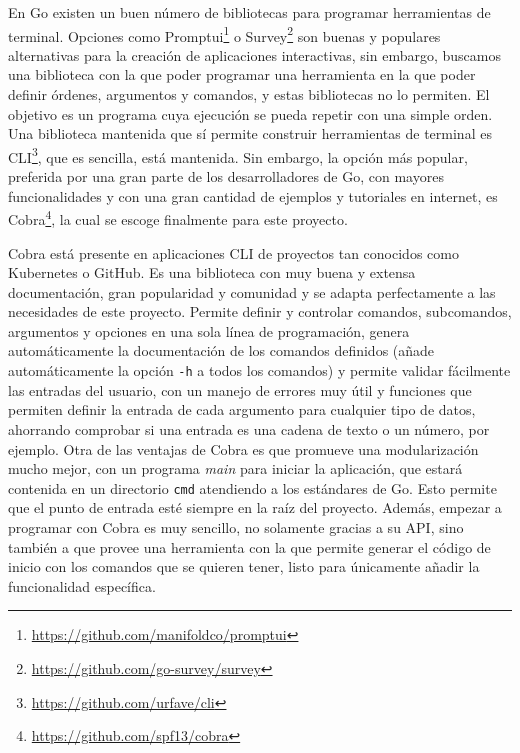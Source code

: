 En Go existen un buen número de bibliotecas para programar herramientas de
terminal. Opciones como
Promptui\footnote{\url{https://github.com/manifoldco/promptui}} o
Survey\footnote{\url{https://github.com/go-survey/survey}} son buenas y
populares alternativas para la creación de aplicaciones interactivas, sin
embargo, buscamos una biblioteca con la que poder programar una herramienta en
la que poder definir órdenes, argumentos y comandos, y estas bibliotecas no lo
permiten. El objetivo es un programa cuya ejecución se pueda repetir con una
simple orden. Una biblioteca mantenida que sí permite construir herramientas de
terminal es CLI\footnote{\url{https://github.com/urfave/cli}}, que es sencilla,
está mantenida. Sin embargo, la opción más popular, preferida por una gran parte
de los desarrolladores de Go, con mayores funcionalidades y con una gran
cantidad de ejemplos y tutoriales en internet, es
Cobra\footnote{\url{https://github.com/spf13/cobra}}, la cual se escoge
finalmente para este proyecto.

Cobra está presente en aplicaciones CLI de proyectos tan conocidos como
Kubernetes o GitHub. Es una biblioteca con muy buena y extensa documentación,
gran popularidad y comunidad y se adapta perfectamente a las necesidades de este
proyecto. Permite definir y controlar comandos, subcomandos, argumentos y
opciones en una sola línea de programación, genera automáticamente la
documentación de los comandos definidos (añade automáticamente la opción \texttt{-h} a 
todos los comandos) y permite validar fácilmente las entradas del
usuario, con un manejo de errores muy útil y funciones que permiten definir la
entrada de cada argumento para cualquier tipo de datos, ahorrando comprobar si
una entrada es una cadena de texto o un número, por ejemplo. Otra de las
ventajas de Cobra es que promueve una modularización mucho mejor, con un
programa \textit{main} para iniciar la aplicación, que estará contenida en un directorio \texttt{cmd} atendiendo 
a los estándares de Go. Esto permite que el punto de
entrada esté siempre en la raíz del proyecto. Además, empezar a programar con
Cobra es muy sencillo, no solamente gracias a su API, sino también a que
provee una herramienta con la que permite generar el código de inicio con los
comandos que se quieren tener, listo para únicamente añadir la funcionalidad
específica.

